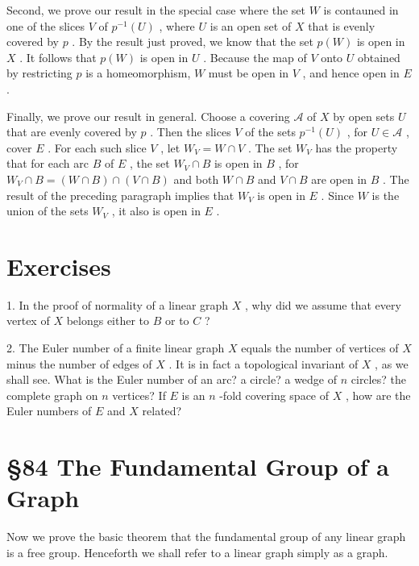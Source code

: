 \documentclass[10pt]{article}
\begin{document}
Second, we prove our result in the special case where the set \(W\) is contauned in one of the slices \(V\) of \({p}^{-1}\left( U\right)\) , where \(U\) is an open set of \(X\) that is evenly covered by \(p\) . By the result just proved, we know that the set \(p\left( W\right)\) is open in \(X\) . It follows that \(p\left( W\right)\) is open in \(U\) . Because the map of \(V\) onto \(U\) obtained by restricting \(p\) is a homeomorphism, \(W\) must be open in \(V\) , and hence open in \(E\) .

Finally, we prove our result in general. Choose a covering \(\mathcal{A}\) of \(X\) by open sets \(U\) that are evenly covered by \(p\) . Then the slices \(V\) of the sets \({p}^{-1}\left( U\right)\) , for \(U \in  \mathcal{A}\) , cover \(E\) . For each such slice \(V\) , let \({W}_{V} = W \cap  V\) . The set \({W}_{V}\) has the property that for each arc \(B\) of \(E\) , the set \({W}_{V} \cap  B\) is open in \(B\) , for \({W}_{V} \cap  B = \left( {W \cap  B}\right)  \cap  \left( {V \cap  B}\right)\) and both \(W \cap  B\) and \(V \cap  B\) are open in \(B\) . The result of the preceding paragraph implies that \({W}_{V}\) is open in \(E\) . Since \(W\) is the union of the sets \({W}_{V}\) , it also is open in \(E\) .

\section*{Exercises}

1. In the proof of normality of a linear graph \(X\) , why did we assume that every vertex of \(X\) belongs either to \(B\) or to \(C\) ?

2. The Euler number of a finite linear graph \(X\) equals the number of vertices of \(X\) minus the number of edges of \(X\) . It is in fact a topological invariant of \(X\) , as we shall see. What is the Euler number of an arc? a circle? a wedge of \(n\) circles? the complete graph on \(n\) vertices? If \(E\) is an \(n\) -fold covering space of \(X\) , how are the Euler numbers of \(E\) and \(X\) related?

\section*{§84 The Fundamental Group of a Graph}

Now we prove the basic theorem that the fundamental group of any linear graph is a free group. Henceforth we shall refer to a linear graph simply as a graph.
\end{document}
